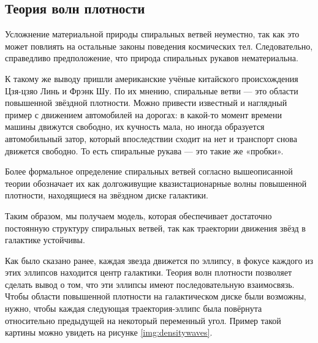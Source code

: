 \subsection{Теория волн плотности}
Усложнение материальной природы спиральных ветвей неуместно, так как это может повлиять на остальные законы поведения космических тел. Следовательно, справедливо предположение, что природа спиральных рукавов нематериальна.

К такому же выводу пришли американские учёные китайского происхождения Цзя-цзяо Линь и Фрэнк Шу. По их мнению, спиральные ветви — это области повышенной звёздной плотности. Можно привести известный и наглядный пример с движением автомобилей на дорогах: в какой-то момент времени машины движутся свободно, их кучность мала, но иногда образуется автомобильный затор, который впоследствии сходит на нет и транспорт снова движется свободно. То есть спиральные рукава — это такие же «пробки».

Более формальное определение спиральных ветвей согласно вышеописанной теории обозначает их как долгоживущие квазистационарные волны повышенной плотности, находящиеся на звёздном диске галактики\cite{beltoforion}.

Таким образом, мы получаем модель, которая обеспечивает достаточно постоянную структуру спиральных ветвей, так как траектории движения звёзд в галактике устойчивы.

Как было сказано ранее, каждая звезда движется по эллипсу, в фокусе каждого из этих эллипсов находится центр галактики. Теория волн плотности позволяет сделать вывод о том, что эти эллипсы имеют последовательную взаимосвязь. Чтобы области повышенной плотности на галактическом диске были возможны, нужно, чтобы каждая следующая траектория-эллипс была повёрнута относительно предыдущей на некоторый переменный угол. Пример такой картины можно увидеть на рисунке \ref{img:densitywaves}.


